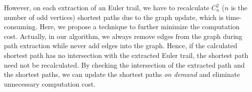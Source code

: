 However, on each extraction of an Euler trail, we have to recalculate $C_n^2$ ($n$ is the number of odd vertices) shortest paths due to the graph update, which is time-consuming. Here, we propose a technique to further minimize the computation cost. Actually, in our algorithm, we always remove edges from the graph during path extraction while never add edges into the graph. Hence, if the calculated shortest path has no intersection with the extracted Euler trail, the shortest path need not be recalculated. By checking the intersection of the extracted path and the shortest paths, we can update the shortest paths \emph{on demand} and eliminate unnecessary computation cost.






